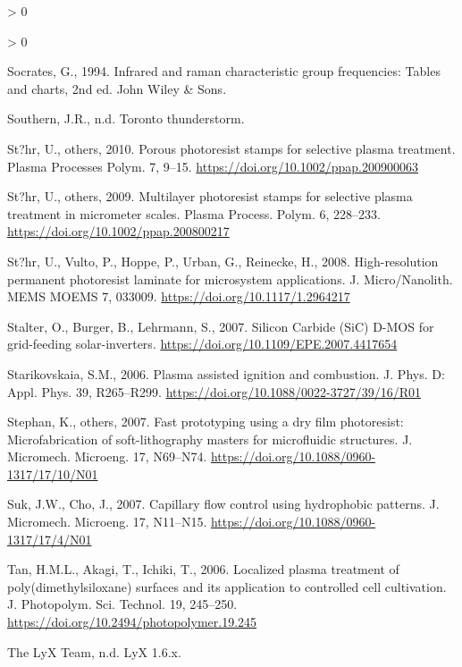 \documentclass[
  11pt,
  twoside]{article}
\newlength{\cslhangindent}
\newenvironment{CSLReferences}[2] %
 {%
  \setlength{\parindent}{0pt}
  \ifodd #1 \everypar{\setlength{\hangindent}{\cslhangindent}}\ignorespaces\fi
  \ifnum #2 > 0
  \setlength{\parskip}{#2\baselineskip}
  \fi
 }%
 {}
\begin{document}
\begin{CSLReferences}{1}{0}
\begin{CSLReferences}{1}{0}
\leavevmode\hypertarget{ref-Socr1994}{}%
Socrates, G., 1994. Infrared and raman characteristic group frequencies: Tables and charts, 2nd ed. John Wiley \& Sons.

\leavevmode\hypertarget{ref-Lightning}{}%
Southern, J.R., n.d. Toronto thunderstorm.

\leavevmode\hypertarget{ref-Stoe10}{}%
St?hr, U., others, 2010. Porous photoresist stamps for selective plasma treatment. Plasma Processes Polym. 7, 9--15. \url{https://doi.org/10.1002/ppap.200900063}

\leavevmode\hypertarget{ref-Stoe09}{}%
St?hr, U., others, 2009. Multilayer photoresist stamps for selective plasma treatment in micrometer scales. Plasma Process. Polym. 6, 228--233. \url{https://doi.org/10.1002/ppap.200800217}

\leavevmode\hypertarget{ref-Stoe08}{}%
St?hr, U., Vulto, P., Hoppe, P., Urban, G., Reinecke, H., 2008. High-resolution permanent photoresist laminate for microsystem applications. J. Micro/Nanolith. MEMS MOEMS 7, 033009. \url{https://doi.org/10.1117/1.2964217}

\leavevmode\hypertarget{ref-Stal07}{}%
Stalter, O., Burger, B., Lehrmann, S., 2007. {Silicon Carbide (SiC) D-MOS for grid-feeding solar-inverters}. \url{https://doi.org/10.1109/EPE.2007.4417654}

\leavevmode\hypertarget{ref-Star06}{}%
Starikovskaia, S.M., 2006. Plasma assisted ignition and combustion. J. Phys. D: Appl. Phys. 39, R265--R299. \url{https://doi.org/10.1088/0022-3727/39/16/R01}

\leavevmode\hypertarget{ref-Step07}{}%
Stephan, K., others, 2007. Fast prototyping using a dry film photoresist: Microfabrication of soft-lithography masters for microfluidic structures. J. Micromech. Microeng. 17, N69--N74. \url{https://doi.org/10.1088/0960-1317/17/10/N01}

\leavevmode\hypertarget{ref-Suk07}{}%
Suk, J.W., Cho, J., 2007. Capillary flow control using hydrophobic patterns. J. Micromech. Microeng. 17, N11--N15. \url{https://doi.org/10.1088/0960-1317/17/4/N01}

\leavevmode\hypertarget{ref-Tan06}{}%
Tan, H.M.L., Akagi, T., Ichiki, T., 2006. Localized plasma treatment of poly(dimethylsiloxane) surfaces and its application to controlled cell cultivation. J. Photopolym. Sci. Technol. 19, 245--250. \url{https://doi.org/10.2494/photopolymer.19.245}

\leavevmode\hypertarget{ref-LyX}{}%
The LyX Team, n.d. LyX 1.6.x.


\end{CSLReferences}
\end{CSLReferences}
\end{document}

